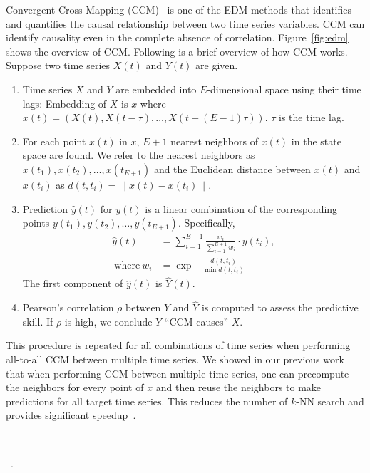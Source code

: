\documentclass[conference]{IEEEtran}
\begin{document}
Convergent Cross Mapping (CCM)~\cite{Sugihara2012} is one of the EDM methods
that identifies and quantifies the causal relationship between two time series
variables. CCM can identify causality even in the complete absence of
correlation. Figure~\ref{fig:edm} shows the overview of CCM\@. Following is a
brief overview of how CCM works. Suppose two time series $X(t)$ and $Y(t)$ are
given.

\begin{enumerate}
    \item Time series $X$ and $Y$ are embedded into $E$-dimensional space
        using their time lags: Embedding of $X$ is $x$ where $x(t)=\left(X(t),
        X(t-\tau), \dots, X(t-(E-1) \tau)\right)$. $\tau$ is the time lag.
    \item For each point $x(t)$ in $x$, $E+1$ nearest neighbors of $x(t)$ in
        the state space are found. We refer to the nearest neighbors as
        $x(t_1), x(t_2), \dots, x(t_{E+1})$ and the Euclidean distance between
        $x(t)$ and $x(t_i)$ as $d(t, t_i)=\lVert x(t) - x(t_i) \rVert$.
    \item Prediction $\hat{y}(t)$ for $y(t)$ is a linear combination of
        the corresponding points $y(t_1), y(t_2), \dots, y(t_{E+1})$.
        Specifically,
        \begin{align*}
            \hat{y}(t) &= \sum^{E+1}_{i=1} \frac{w_i}{\sum^{E+1}_{i=1}{w_i}} \cdot y(t_i),\\
            ~\text{where}~w_i&=\exp{-\frac{d(t, t_i)}{\min{d(t, t_i)}}}
        \end{align*}
        The first component of $\hat{y}(t)$ is $\hat{Y}(t)$.
    \item Pearson's correlation $\rho$ between $Y$ and $\hat{Y}$ is computed
        to assess the predictive skill. If $\rho$ is high, we conclude $Y$
        ``CCM-causes'' $X$.
\end{enumerate}

This procedure is repeated for all combinations of time series when performing
all-to-all CCM between multiple time series. We showed in our previous
work~\cite{mpedm} that when performing CCM between multiple time series, one can
precompute the neighbors for every point of $x$ and then reuse the neighbors to
make predictions for all target time series. This reduces the number of $k$-NN
search and provides significant speedup~\cite{mpedm}.

~\cite{Natsukawa2017,VanBerkel2020}

~\cite{Pu2019,Ma2017}.
\end{document}
